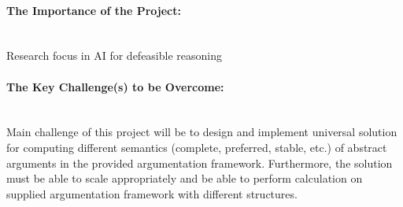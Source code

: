 \paragraph{The Importance of the Project:} \mbox{}\\
Research focus in AI for defeasible reasoning

\paragraph{The Key Challenge(s) to be Overcome:} \mbox{}\\
Main challenge of this project will be to design and implement universal solution for computing different semantics (complete, preferred, stable, etc.) of abstract arguments in the provided argumentation framework. Furthermore, the solution must be able to scale appropriately and be able to perform calculation on supplied argumentation framework with different structures.
